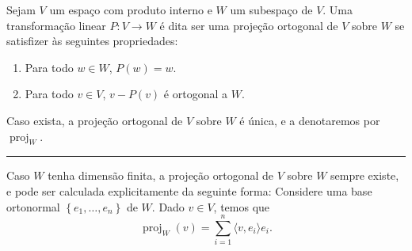 \begin{definition}
	Sejam $V$ um espaço com produto interno e $W$ um subespaço de $V$. Uma transformação linear $P\colon V\to W$ é dita ser uma projeção ortogonal de $V$ sobre $W$ se satisfizer às seguintes propriedades:
	\begin{enumerate}
		\item Para todo $w\in W$, $P(w)=w$.
		\item Para todo $v\in V$, $v-P(v)$ é ortogonal a $W$.
	\end{enumerate}
	Caso exista, a projeção ortogonal de $V$ sobre $W$ é única, e a denotaremos por $\operatorname{proj}_W$.
	
	\hrule
	
	Caso $W$ tenha dimensão finita, a projeção ortogonal de $V$ sobre $W$ sempre existe, e pode ser calculada explicitamente da seguinte forma: Considere uma base ortonormal $\left\{e_1,\ldots,e_n\right\}$ de $W$. Dado $v\in V$, temos que
	\[\operatorname{proj}_W(v)=\sum_{i=1}^n\langle v,e_i\rangle e_i.\]
\end{definition}